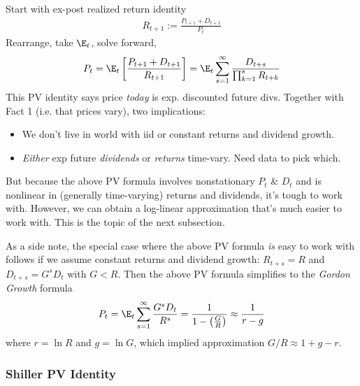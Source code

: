 \documentclass[12pt]{article}
\theoremstyle{plain}
\theoremstyle{definition}
\theoremstyle{remark}
\begin{document}
\begin{multicols*}{2}
Start with ex-post realized return identity
\begin{align}
  R_{t+1}
  :=
  \frac{P_{t+1}+D_{t+1}}{P_t}
  \label{expostrealizedreturns}
\end{align}
Rearrange, take $\E_t$, solve forward,
\begin{align*}
  P_{t}
  = \E_t\left[\frac{P_{t+1}+D_{t+1}}{R_{t+1}}\right]
  =
  \E_t\sum_{s=1}^\infty
  \frac{D_{t+s}}{\prod_{k=1}^s R_{t+k}}
\end{align*}
This PV identity says price \emph{today} is exp. discounted future divs.
Together with Fact 1 (i.e. that prices vary), two implications:
\begin{itemize}
  \item We don't live in world with iid or constant returns and dividend
    growth.
  \item
    \emph{Either} exp future \emph{dividends} or \emph{returns}
    time-vary. Need data to pick which.
\end{itemize}
But because the above PV formula involves nonstationary $P_t$ \& $D_t$
and is nonlinear in (generally time-varying) returns and dividends, it's
tough to work with. However, we can obtain a log-linear approximation
that's much easier to work with. This is the topic of the next
subsection.

As a side note, the special case where the above PV formula \emph{is}
easy to work with follows if we assume constant returns and dividend
growth: $R_{t+s}=R$ and $D_{t+s}=G^sD_t$ with $G<R$. Then the above PV
formula simplifies to the \emph{Gordon Growth} formula
\begin{align*}
  P_{t}
  =
  \E_t\sum_{s=1}^\infty
  \frac{G^sD_{t}}{R^s}
  =
  \frac{1}{1-\left(\frac{G}{R}\right)}
  \approx
  \frac{1}{r-g}
\end{align*}
where $r=\ln R$ and $g=\ln G$, which implied approximation
$G/R\approx 1+g-r$.



\columnbreak
\subsubsection{Shiller PV Identity}


\end{multicols*}
\end{document}

